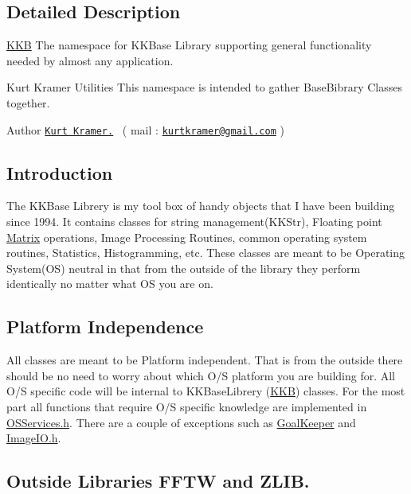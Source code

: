 \subsection{Detailed Description}
\hyperlink{namespace_k_k_b}{K\+KB} The namespace for K\+K\+Base Library supporting general functionality needed by almost any application. 

Kurt Kramer Utilities This namespace is intended to gather Base\+Bibrary Classes together. \begin{DoxyParagraph}{Author }
\href{http://figment.cse.usf.edu/~kkramer/}{\tt Kurt Kramer.}~\newline
 ( mail \+: \href{mailto:kurtkramer@gmail.com}{\tt kurtkramer@gmail.\+com} )~\newline

\end{DoxyParagraph}
\hypertarget{namespace_k_k_b_Introduction}{}\subsection{Introduction}\label{namespace_k_k_b_Introduction}
The K\+K\+Base Librery is my tool box of handy objects that I have been building since 1994. It contains classes for string management(\+K\+K\+Str), Floating point \hyperlink{class_k_k_b_1_1_matrix}{Matrix} operations, Image Processing Routines, common operating system routines, Statistics, Histogramming, etc. These classes are meant to be Operating System(\+O\+S) neutral in that from the outside of the library they perform identically no matter what OS you are on. ~\newline
 \hypertarget{namespace_k_k_b_PlatformIndependence}{}\subsection{Platform Independence}\label{namespace_k_k_b_PlatformIndependence}
All classes are meant to be Platform independent. That is from the outside there should be no need to worry about which O/S platform you are building for. All O/S specific code will be internal to K\+K\+Base\+Librery (\hyperlink{namespace_k_k_b}{K\+KB}) classes. For the most part all functions that require O/S specific knowledge are implemented in \hyperlink{_o_sservices_8h}{O\+S\+Services.\+h}. There are a couple of exceptions such as \hyperlink{class_k_k_b_1_1_goal_keeper}{Goal\+Keeper} and \hyperlink{_image_i_o_8h}{Image\+I\+O.\+h}. ~\newline
 \hypertarget{namespace_k_k_b_OutsideLibraries}{}\subsection{Outside Libraries F\+F\+T\+W and Z\+L\+I\+B.}\label{namespace_k_k_b_OutsideLibraries}
